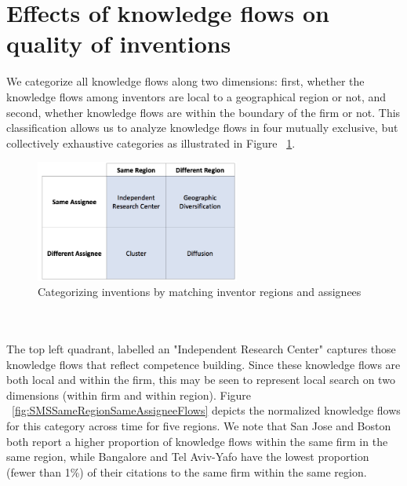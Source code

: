 \documentclass[10pt,letterpaper]{article}
\begin{document}
\section*{Effects of knowledge flows on quality of inventions}
We categorize all knowledge flows along two dimensions:  first, whether the knowledge flows among inventors are local to a geographical region or not, and second, whether knowledge flows are within the boundary of the firm or not. This classification allows us to analyze knowledge flows in four mutually exclusive, but collectively exhaustive categories as illustrated in Figure ~\ref{fig:2x2}. 
\begin{figure}[h]
\begin{centering}
  \includegraphics[width=0.6\textwidth]{2x2}
  \caption{Categorizing inventions by matching inventor regions and assignees}
  \label{fig:2x2}
\end{centering}
\end{figure}
\\\\
The top left quadrant, labelled an "Independent Research Center" captures those knowledge flows that reflect competence building. Since these knowledge flows  are both local and within the firm, this may be seen to represent local search on two dimensions (within firm and within region).  Figure ~\ref{fig:SMSSameRegionSameAssigneeFlows} depicts the normalized knowledge flows for this category across time for five regions. We note that San Jose and Boston both report a higher proportion of knowledge flows within the same firm in the same region, while Bangalore and Tel Aviv-Yafo have the lowest proportion (fewer than 1\%) of their citations to the same firm within the same region.
\\\\
\end{document}
